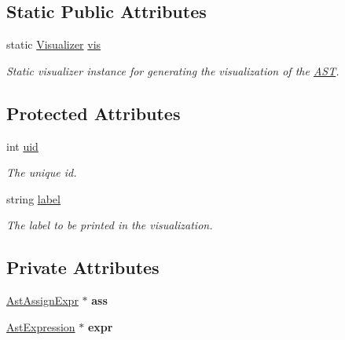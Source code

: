 \subsection*{Static Public Attributes}
\begin{DoxyCompactItemize}
\item 
\hypertarget{classAST_aca9e6637209b31e03a09c0d42f29bdfa}{static \hyperlink{classVisualizer}{Visualizer} \hyperlink{classAST_aca9e6637209b31e03a09c0d42f29bdfa}{vis}}\label{classAST_aca9e6637209b31e03a09c0d42f29bdfa}

\begin{DoxyCompactList}\small\item\em Static visualizer instance for generating the visualization of the \hyperlink{classAST}{A\-S\-T}. \end{DoxyCompactList}\end{DoxyCompactItemize}
\subsection*{Protected Attributes}
\begin{DoxyCompactItemize}
\item 
\hypertarget{classAST_a847b778f1c3dd5a19de32de432ee6e15}{int \hyperlink{classAST_a847b778f1c3dd5a19de32de432ee6e15}{uid}}\label{classAST_a847b778f1c3dd5a19de32de432ee6e15}

\begin{DoxyCompactList}\small\item\em The unique id. \end{DoxyCompactList}\item 
\hypertarget{classAST_ab2e239ccc0688d2341724432ff5a1a31}{string \hyperlink{classAST_ab2e239ccc0688d2341724432ff5a1a31}{label}}\label{classAST_ab2e239ccc0688d2341724432ff5a1a31}

\begin{DoxyCompactList}\small\item\em The label to be printed in the visualization. \end{DoxyCompactList}\end{DoxyCompactItemize}
\subsection*{Private Attributes}
\begin{DoxyCompactItemize}
\item 
\hypertarget{classAstExpression_a936372ce6b0899752ec6e9933d3ea36f}{\hyperlink{classAstAssignExpr}{Ast\-Assign\-Expr} $\ast$ {\bfseries ass}}\label{classAstExpression_a936372ce6b0899752ec6e9933d3ea36f}

\item 
\hypertarget{classAstExpression_ab80c14227440b7a62eb35cb10e359e92}{\hyperlink{classAstExpression}{Ast\-Expression} $\ast$ {\bfseries expr}}\label{classAstExpression_ab80c14227440b7a62eb35cb10e359e92}

\end{DoxyCompactItemize}



